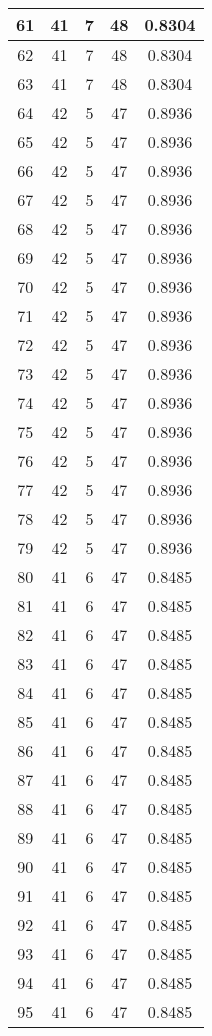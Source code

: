 \documentclass[letterpaper, 12pt]{article}
\begin{document}
\begin{longtable}{|c|c|c|c|c|}
61 & 41 & 7 & 48 & 0.8304 \\
\hline
62 & 41 & 7 & 48 & 0.8304 \\
\hline
63 & 41 & 7 & 48 & 0.8304 \\
\hline
64 & 42 & 5 & 47 & 0.8936 \\
\hline
65 & 42 & 5 & 47 & 0.8936 \\
\hline
66 & 42 & 5 & 47 & 0.8936 \\
\hline
67 & 42 & 5 & 47 & 0.8936 \\
\hline
68 & 42 & 5 & 47 & 0.8936 \\
\hline
69 & 42 & 5 & 47 & 0.8936 \\
\hline
70 & 42 & 5 & 47 & 0.8936 \\
\hline
71 & 42 & 5 & 47 & 0.8936 \\
\hline
72 & 42 & 5 & 47 & 0.8936 \\
\hline
73 & 42 & 5 & 47 & 0.8936 \\
\hline
74 & 42 & 5 & 47 & 0.8936 \\
\hline
75 & 42 & 5 & 47 & 0.8936 \\
\hline
76 & 42 & 5 & 47 & 0.8936 \\
\hline
77 & 42 & 5 & 47 & 0.8936 \\
\hline
78 & 42 & 5 & 47 & 0.8936 \\
\hline
79 & 42 & 5 & 47 & 0.8936 \\
\hline
80 & 41 & 6 & 47 & 0.8485 \\
\hline
81 & 41 & 6 & 47 & 0.8485 \\
\hline
82 & 41 & 6 & 47 & 0.8485 \\
\hline
83 & 41 & 6 & 47 & 0.8485 \\
\hline
84 & 41 & 6 & 47 & 0.8485 \\
\hline
85 & 41 & 6 & 47 & 0.8485 \\
\hline
86 & 41 & 6 & 47 & 0.8485 \\
\hline
87 & 41 & 6 & 47 & 0.8485 \\
\hline
88 & 41 & 6 & 47 & 0.8485 \\
\hline
89 & 41 & 6 & 47 & 0.8485 \\
\hline
90 & 41 & 6 & 47 & 0.8485 \\
\hline
91 & 41 & 6 & 47 & 0.8485 \\
\hline
92 & 41 & 6 & 47 & 0.8485 \\
\hline
93 & 41 & 6 & 47 & 0.8485 \\
\hline
94 & 41 & 6 & 47 & 0.8485 \\
\hline
95 & 41 & 6 & 47 & 0.8485 \\

\end{longtable}
\end{document}

